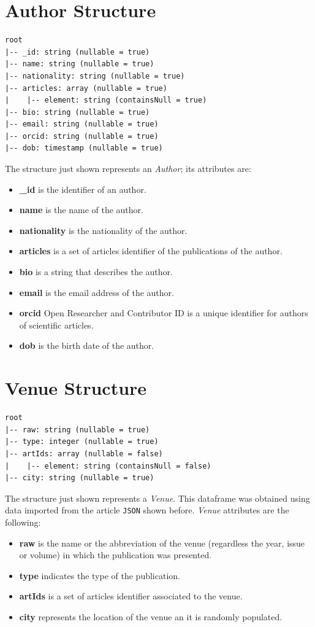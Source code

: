 \documentclass{Configuration_Files/PoliMi3i_thesis}
\begin{document}
\section{Author Structure}
\begin{lstlisting}
root
|-- _id: string (nullable = true)
|-- name: string (nullable = true)
|-- nationality: string (nullable = true)
|-- articles: array (nullable = true)
|    |-- element: string (containsNull = true)
|-- bio: string (nullable = true)
|-- email: string (nullable = true)
|-- orcid: string (nullable = true)
|-- dob: timestamp (nullable = true)
\end{lstlisting}
The structure just shown represents an \emph{Author}; its attributes are:
\begin{itemize}
    \item \textbf{\_id} is the identifier of an author.
    \item \textbf{name} is the name of the author.
    \item \textbf{nationality} is the nationality of the author.
    \item \textbf{articles} is a set of articles identifier of the publications of the author.
    \item \textbf{bio} is a string that describes the author.
    \item \textbf{email} is the email address of the author.
    \item \textbf{orcid} Open Researcher and Contributor ID is a unique identifier for authors of scientific articles.
    \item \textbf{dob} is the birth date of the author.
\end{itemize}

\section{Venue Structure}
\begin{lstlisting}
root
|-- raw: string (nullable = true)
|-- type: integer (nullable = true)
|-- artIds: array (nullable = false)
|    |-- element: string (containsNull = false)
|-- city: string (nullable = true)
\end{lstlisting}
The structure just shown represents a \emph{Venue}. This dataframe was obtained using data imported from
the article \verb |JSON| shown before. \emph{Venue} attributes are the following:
\begin{itemize}
    \item \textbf{raw} is the name or the abbreviation of the venue (regardless the year, issue or volume) in which the
        publication was presented.
    \item \textbf{type} indicates the type of the publication.
    \item \textbf{artIds} is a set of articles identifier associated to the venue.
    \item \textbf{city} represents the location of the venue an it is randomly populated.
\end{itemize}
\end{document}
